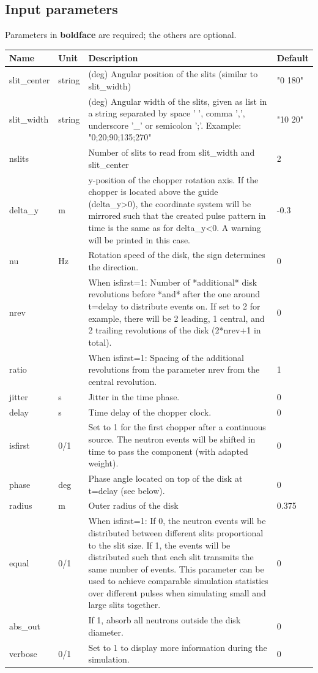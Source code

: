 \subsection*{Input parameters}
Parameters in \textbf{boldface} are required; the others are optional.

\begin{longtable}{p{}p{}p{}p{}}
\toprule
\textbf{Name} & \textbf{Unit} & \textbf{Description} & \textbf{Default} \\
\midrule
\endhead
slit\_center & string & (deg)   Angular position of the slits (similar to slit\_width) & "0 180" \\
slit\_width & string & (deg)   Angular width of the slits, given as list in a string separated by space ' ', comma ',', underscore '\_' or semicolon ';'. Example: "0;20;90;135;270" & "10 20" \\
nslits &  & Number of slits to read from slit\_width and slit\_center & 2 \\
delta\_y & m & y-position of the chopper rotation axis. If the chopper is located above the guide (delta\_y\textgreater{}0), the coordinate system will be mirrored such that the created pulse pattern in time is the same as for delta\_y\textless{}0. A warning will be printed in this case. & -0.3 \\
nu & Hz & Rotation speed of the disk, the sign determines the direction. & 0 \\
nrev &   & When isfirst=1: Number of *additional* disk revolutions before *and* after the one around t=delay to distribute events on. If set to 2 for example, there will be 2 leading, 1 central, and 2 trailing revolutions of the disk (2*nrev+1 in total). & 0 \\
ratio &   & When isfirst=1: Spacing of the additional revolutions from the parameter nrev from the central revolution. & 1 \\
jitter & s & Jitter in the time phase. & 0 \\
delay & s & Time delay of the chopper clock. & 0 \\
isfirst & 0/1 & Set to 1 for the first chopper after a continuous source. The neutron events will be shifted in time to pass the component (with adapted weight). & 0 \\
phase & deg & Phase angle located on top of the disk at t=delay (see below). & 0 \\
radius & m & Outer radius of the disk & 0.375 \\
equal & 0/1 & When isfirst=1: If 0, the neutron events will be distributed between different slits proportional to the slit size. If 1, the events will be distributed such that each slit transmits the same number of events. This parameter can be used to achieve comparable simulation statistics over different pulses when simulating small and large slits together. & 0 \\
abs\_out &  & If 1, absorb all neutrons outside the disk diameter. & 0 \\
verbose & 0/1 & Set to 1 to display more information during the simulation. & 0 \\
\bottomrule
\end{longtable}

